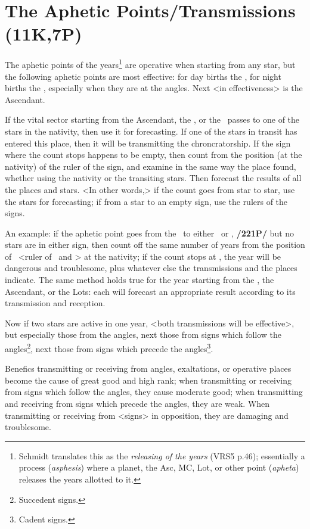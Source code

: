\section{The Aphetic Points/Transmissions (11K,7P)}
The aphetic points of the years\footnote{Schmidt translates this as the \textsl{releasing of the years} (VRS5 p.46); essentially a process (\textsl{asphesis}) where a planet, the Asc, MC, Lot, or other point (\textsl{apheta}) releases the years allotted to it.}  are operative when starting from any star, but the following aphetic points are most effective: for day births the \Sun, for night births the \Moon, especially when they are at the
angles. Next <in effectiveness> is the Ascendant. 

If \mndl the vital sector starting from the Ascendant, the \Moon, or the \Sun\, passes to one of the stars in the nativity, then use it for forecasting. If one of the stars in transit has entered this place, then it will be transmitting the chroncratorship. If the sign where the count stops happens to be empty, then count from the position (at the nativity) of the ruler of the sign, and examine in the same way the place found, whether using the nativity or the transiting stars. Then forecast the results of all the places and stars. <In other words,> if the count goes from star to star, use the stars for forecasting; if
from a star to an empty sign, use the rulers of the signs.

An example: if the aphetic point goes from the \Moon\, to either \Aries\, or \Scorpio, \textbf{/221P/} but no stars are
in either sign, then count off the same number of years from the position of \Mars\, <ruler of \Aries\, and \Scorpio> at the nativity; if the count stops at \Saturn, the year will be dangerous and troublesome, plus whatever else the transmissions and the places indicate. The same method holds true for the year starting from the \Sun, the Ascendant, or the Lots: each will forecast an appropriate result according to its transmission and reception.

Now if two stars are active in one year, <both transmissions will be effective>, but especially those from the angles, next those from signs which follow the angles\footnote{Succedent signs.}, next those from signs which precede the angles\footnote{Cadent signs.}. 

Benefics transmitting or receiving from angles, exaltations, or operative places become the cause of great good and high rank; when transmitting or receiving from signs which follow the angles, they cause moderate good; when transmitting and receiving from signs which precede the angles, they are weak. When transmitting or receiving from <signs> in opposition, they are damaging and troublesome. 

